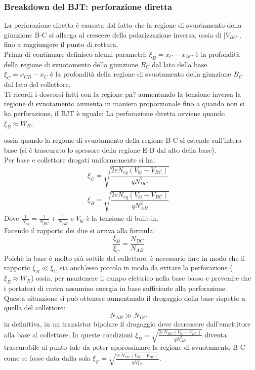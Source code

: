 \subsubsection{Breakdown del BJT: perforazione diretta}
La perforazione diretta è causata dal fatto che la regione di svuotamento della giunzione B-C si allarga al crescere della polarizzazione inversa, ossia di $|V_{BC}|$, fino a raggiungere il punto di rottura.\\
Prima di continuare definisco alcuni parametri:
$\xi_B = x_C-x_{BC}$ è la profondità della regione di svuotamento della giunzione $B_C$ dal lato della base.\\
$\xi_C = x_{CB}-x_{C}$ è la profondità della regione di svuotamento della giunzione $B_C$ dal lato del collettore.\\
Ti ricordi i doscorsi fatti con la regione pn? aumentando la tensione inversa la regione di svuotamento aumenta in maniera proporzionale fino a quando non si ha perforazione, il BJT è uguale:
La perforazione diretta avviene quando $\xi_B \approx W_B$,

ossia quando la regione di svuotamento della regione B-C sì estende sull'intera base (si è trascurato lo spessore della regione E-B dal alto della base). \\
Per base e collettore drogati uniformemente sì ha:
\begin{align}
    \xi_C=\sqrt{\dfrac{2\varepsilon N_{eq}(V_{bi}-V_{BC})}{qN_{DC}^2}}\nonumber\\
    \xi_B=\sqrt{\dfrac{2\varepsilon N_{eq}(V_{bi}-V_{BC})}{qN_{AB}^2}} \nonumber
\end{align}
Dove $\frac{1}{N_{eq}}=\frac{1}{N_{DC}}+\frac{1}{N_{AB}}$ e $V_{bi}$ è la tensione di built-in.\\
Facendo il rapporto dei due si arriva alla formula:
\begin{equation}
    \dfrac{\xi_B}{\xi_C}=\dfrac{N_{DC}}{N_{AB}}
\end{equation}
Poichè la base è molto più sottile del collettore, è necessario fare in modo che il rapporto $\xi_B \ll \xi_C$ sia anch'esso piccolo in modo da evitare la perforazione ($\xi_B \approx W_B$) ossia, per mantenere il campo elettrico nella base basso e prevenire che i portatori di carica assumino  energia in base sufficiente alla perforazione. \\Questa situazione si può ottenere aumentando il drogaggio della base rispetto a quella del collettore:  
\begin{equation}
    N_{AB} \gg N_{DC}
\end{equation}
in definitiva, in un transistor bipolare il drogaggio deve decrescere dall'emettitore alla base al collettore. In queste condizioni $\xi_B=\sqrt{\frac{2\varepsilon N_{DC}(V_{bi}-V_{BC})}{qN_{AB}^2}}$ diventa trascurabile al punto tale da poter approssimare la regione di svuotamento B-C come se fosse data dalla sola $\xi_C=\sqrt{\frac{2\varepsilon N_{DC}(V_{bi}-V_{BC})}{qN_{DC}^2}}$.\\
